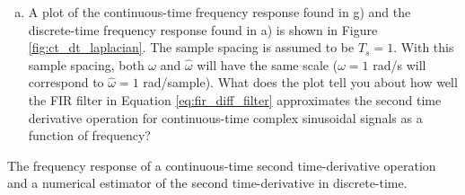 \begin{enumerate}
\begin{enumerate}[a)]
  \item A plot of the continuous-time frequency response found in g) and the discrete-time frequency response found in a) is shown in Figure \ref{fig:ct_dt_laplacian}. The sample spacing is assumed to be $T_s=1$. With this sample spacing, both $\omega$ and $\hat{\omega}$ will have the same scale ($\omega = 1$ rad/s will correspond to $\hat{\omega}=1$ rad/sample). What does the plot tell you about how well the FIR filter in Equation \ref{eq:fir_diff_filter} approximates the second time derivative operation for continuous-time complex sinusoidal signals as a function of frequency?
\end{enumerate}


\begin{marginfigure}[-5cm]
\begin{center}
\end{center}
\caption{The frequency response of a continuous-time second time-derivative operation and a numerical estimator of the second time-derivative in discrete-time.}
\label{fig:ct_dt_laplacian}
\end{marginfigure}
\vspace{3cm}


\end{enumerate}
